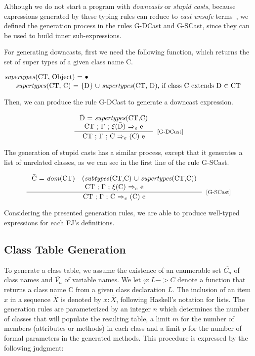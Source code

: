 \documentclass[tese,capa,english]{texufpel}
\begin{document}
Although we do not start a program with \emph{downcasts} or \emph{stupid casts}, because expressions generated by these typing rules can reduce to \emph{cast unsafe} terms~\cite{Igarashi:2001:FJM:503502.503505}, we defined the generation process in the rules {\footnotesize G-DCast} and {\footnotesize G-SCast}, since they can be used to build inner sub-expressions.

For generating downcasts, first we need the following function, which returns the set of super types of a given class name C.

\[
\stackanchor{\textrm{\emph{supertypes}(CT, Object) = $\bullet$} \hspace{235pt}}
            {\textrm{\emph{supertypes}(CT, C) = \{D\} $\cup$ \emph{supertypes}(CT, D), if class C extends D $\in$ CT}}
\]

Then, we can produce the rule {\footnotesize G-DCast} to generate a downcast expression.

\[
\inference{\textrm{\={D} = \emph{supertypes}(CT,C)} \\
           \textrm{CT ; $\Gamma$ ; $\xi$(\={D}) $\Rightarrow_e$ e}}
          {\textrm{CT ; $\Gamma$ ; C $\Rightarrow_e$ (C) e}}[\footnotesize{[G-DCast]}]
\]

The generation of stupid casts has a similar process, except that it generates a list of unrelated classes, as we can see in the first line of the rule {\footnotesize G-SCast}.

\[
\inference{\textrm{\={C} = \emph{dom}(CT) - (\emph{subtypes}(CT,C) $\cup$ \emph{supertypes}(CT,C))} \\
           \textrm{CT ; $\Gamma$ ; $\xi$(\={C}) $\Rightarrow_e$ e}}
          {\textrm{CT ; $\Gamma$ ; C $\Rightarrow_e $ (C) e}}[\footnotesize{[G-SCast]}]
\]

Considering the presented generation rules, we are able to produce well-typed expressions for each FJ's definitions.

\subsection{Class Table Generation}

To generate a class table, we assume the existence of an enumerable set $\overline{C_n}$ of class names and $\overline{V_n}$ of variable names. We let $\varphi : L -> C$ denote a function that returns a class name C from a given class declaration $L$. The inclusion of an item $x$ in a sequence $\overline{X}$ is denoted by $x : \overline{X}$, following Haskell's notation for lists. The generation rules are parameterized by an integer $n$ which determines the number of classes that will populate the resulting table, a limit $m$ for the number of members (attributes or methods) in each class and a limit $p$ for the number of formal parameters in the generated methods. This procedure is expressed by the following judgment:
\end{document}
